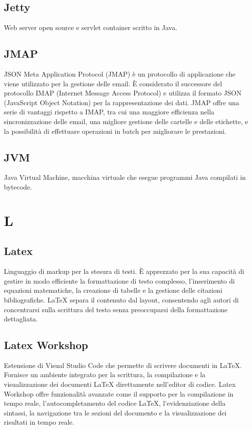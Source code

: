 \documentclass[12pt]{article}
\begin{document}
		\subsection{Jetty}
		Web server open source e servlet container scritto in Java.

		\subsection{JMAP}
		JSON Meta Application Protocol (JMAP) è un protocollo di applicazione che viene utilizzato per la gestione delle email. È considerato il successore del protocollo IMAP (Internet Message Access Protocol) e utilizza il formato JSON (JavaScript Object Notation) per la rappresentazione dei dati. JMAP offre una serie di vantaggi rispetto a IMAP, tra cui una maggiore efficienza nella sincronizzazione delle email, una migliore gestione delle cartelle e delle etichette, e la possibilità di effettuare operazioni in batch per migliorare le prestazioni. 

		\subsection{JVM}
		Java Virtual Machine, macchina virtuale che esegue programmi Java compilati in bytecode.
	\clearpage
	\section{L}
		\subsection{Latex}
		Linguaggio di markup per la stesura di testi. È apprezzato per la sua capacità di gestire in modo efficiente la formattazione di testo complesso, l'inserimento di equazioni matematiche, la creazione di tabelle e la gestione delle citazioni bibliografiche. LaTeX separa il contenuto dal layout, consentendo agli autori di concentrarsi sulla scrittura del testo senza preoccuparsi della formattazione dettagliata. 

		\subsection{Latex Workshop}
		Estensione di Visual Studio Code che permette di scrivere documenti in LaTeX. Fornisce un ambiente integrato per la scrittura, la compilazione e la visualizzazione dei documenti LaTeX direttamente nell'editor di codice. Latex Workshop offre funzionalità avanzate come il supporto per la compilazione in tempo reale, l'autocompletamento del codice LaTeX, l'evidenziazione della sintassi, la navigazione tra le sezioni del documento e la visualizzazione dei risultati in tempo reale.
\end{document}
